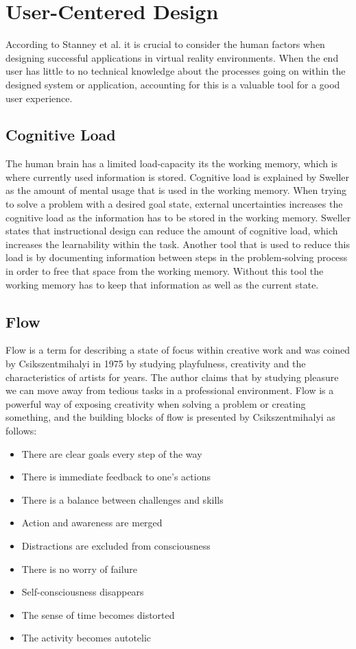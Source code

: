 \section{User-Centered Design}
\label{theory:user-centered}
According to Stanney et al. it is crucial to consider the human factors when designing successful applications in virtual reality environments. When the end user has little to no technical knowledge about the processes going on within the designed system or application, accounting for this is a valuable tool for a good user experience.
\cite{UCD:stanney1998human}
\subsection{Cognitive Load}
\label{theory:user-centered:cognitiveload}
The human brain has a limited load-capacity its the working memory, which is where currently used information is stored\cite{UCD:shah1999models}. Cognitive load is explained by Sweller as the amount of mental usage that is used in the working memory\cite{UCD:sweller1988cognitive}. When trying to solve a problem with a desired goal state, external uncertainties increases the cognitive load as the information has to be stored in the working memory. Sweller states that instructional design can reduce the amount of cognitive load, which increases the learnability within the task. Another tool that is used to reduce this load is by documenting information between steps in the problem-solving process in order to free that space from the working memory\cite{UCD:sweller1988cognitive}. Without this tool the working memory has to keep that information as well as the current state.
\subsection{Flow}
\label{theory:user-centered:flow}
Flow is a term for describing a state of focus within creative work and was coined by Csikszentmihalyi in 1975 by studying playfulness, creativity and the characteristics of artists for years. \cite{UCD:boredom1975anxiety} The author claims that by studying pleasure we can move away from tedious tasks in a professional environment. Flow is a powerful way of exposing creativity when solving a problem or creating something, and the building blocks of flow is presented by Csikszentmihalyi as follows:\cite{UCD:csikszentmihalyi1996flow}

\begin{itemize}
  \item There are clear goals every step of the way
  \item There is immediate feedback to one's actions
  \item There is a balance between challenges and skills
  \item Action and awareness are merged
  \item Distractions are excluded from consciousness
  \item There is no worry of failure
  \item Self-consciousness disappears
  \item The sense of time becomes distorted
  \item The activity becomes autotelic
\end{itemize}

